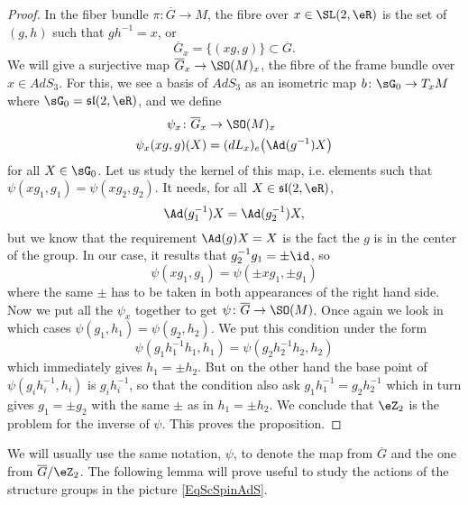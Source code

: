 \begin{proof}
In the fiber bundle $\pi\colon \overline{G}\to M$, the fibre over $x\in\SL(2,\eR)$ is the set of $(g,h)$ such that $gh^{-1}=x$, or
\[
  \overline{G}_{x}=\{ (xg,g) \}\subset \overline{G}.
\]
We will give a surjective map $\overline{G}_{x}\to\SO(M)_{x}$, the fibre of the frame bundle over $x\in AdS_3$. For this, we see a basis of $AdS_3$ as an isometric map $b\colon \sG_0\to T_{x}M$ where $\sG_{0}=\mathfrak{sl}(2,\eR)$, and we define
\begin{equation}
\begin{aligned}
 \psi_{x}\colon \overline{G}_{x}&\to \SO(M)_{x} \\
\psi_{x}(xg,g)(X)&=(dL_{x})_{e}\big( \Ad(g^{-1})X \big)
\end{aligned}
\end{equation}
for all $X\in\sG_0$. Let us study the kernel of this map, i.e. elements such that $\psi(xg_1,g_1)=\psi(xg_2,g_2)$. It needs, for all $X\in\mathfrak{sl}(2,\eR)$,
\[
  \Ad(g_1^{-1})X=\Ad(g_2^{-1})X,
\]
but we know that the requirement $\Ad(g)X=X$ is the fact the $g$ is in the center of the group. In our case, it results that $g_2^{-1}g_1=\pm\id$, so
\[
  \psi(xg_1,g_1)=\psi(\pm xg_1,\pm g_1)
\]
where the same $\pm$ has to be taken in both appearances of the right hand side. Now we put all the $\psi_{x}$ together to get $\psi\colon \overline{G}\to \SO(M)$. Once again we look in which cases $\psi(g_1,h_1)=\psi(g_2,h_2)$. We put this condition under the form
\[
  \psi(g_1h_1^{-1}h_1,h_1)=\psi(g_2h_2^{-1}h_2,h_2)
\]
which immediately gives $h_1=\pm h_2$. But on the other hand the base point of $\psi(g_{i}h_{i}^{-1},h_{i})$ is $g_{i}h_{i}^{-1}$, so that the condition also ask $g_1h_1^{-1}=g_2h_2^{-1}$ which in turn gives $g_1=\pm g_2$ with the same $\pm$ as in $h_1=\pm h_2$. We conclude that $\eZ_{2}$ is the problem for the inverse of $\psi$. This proves the proposition.
\end{proof}
We will usually use the same notation, $\psi$, to denote the map from $\overline{G}$ and the one from $\overline{G}/\eZ_{2}$. The following lemma will prove useful to study the actions of the structure groups in the picture \eqref{EqScSpinAdS}.

